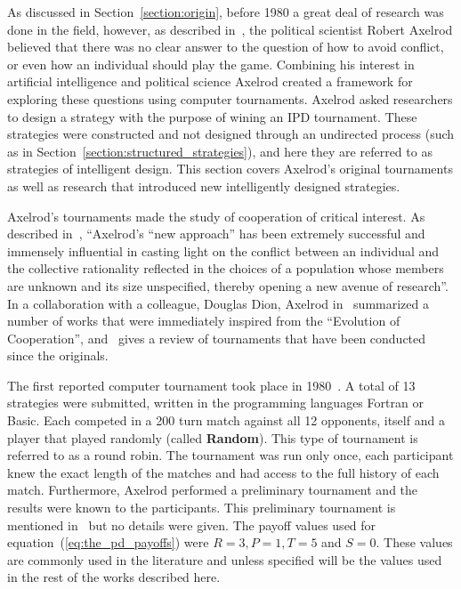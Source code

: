 \documentclass{article}
\theoremstyle{definition}
\begin{document}
As discussed in Section~\ref{section:origin}, before 1980 a great deal of
research was done in the field, however, as described in~\cite{Axelrod2012}, the
political scientist Robert Axelrod believed that there was no clear answer to the
question of how to avoid conflict, or even how an individual should play the
game. Combining his interest in artificial intelligence and political science
Axelrod created a framework for exploring these questions using computer
tournaments. Axelrod asked researchers to design a strategy with the purpose of
wining an IPD tournament. These strategies were constructed and not designed
through an undirected process (such as in
Section~\ref{section:structured_strategies}), and here they are referred to as
strategies of intelligent design. This section covers Axelrod's original
tournaments as well as research that introduced new intelligently designed
strategies.

Axelrod's tournaments made the study of cooperation of critical interest. As
described in~\cite{Rapoport2015}, ``Axelrod's “new approach” has been extremely
successful and immensely influential in casting light on the conflict between an
individual and the collective rationality reflected in the choices of a
population whose members are unknown and its size unspecified, thereby opening a
new avenue of research''. In a collaboration with a colleague, Douglas Dion,
Axelrod in~\cite{Axelrod1988} summarized a number of works that were immediately
inspired from the ``Evolution of Cooperation'', and~\cite{Jurisic2012} gives a
review of tournaments that have been conducted since the originals.

The first reported computer tournament took place in 1980~\cite{Axelrod1980a}. A
total of 13 strategies were submitted, written in the programming languages
Fortran or Basic. Each competed in a 200 turn match against all 12 opponents,
itself and a player that played randomly (called \textbf{Random}). This type of
tournament is referred to as a round robin. The tournament was run only once,
each participant knew the exact length of the matches and had access to the full
history of each match. Furthermore, Axelrod performed a preliminary tournament
and the results were known to the participants. This preliminary tournament is
mentioned in~\cite{Axelrod1980a} but no details were given. The payoff values
used for equation~(\ref{eq:the_pd_payoffs}) were \(R=3, P=1, T=5\) and \(S=0\).
These values are commonly used in the literature and unless specified will be
the values used in the rest of the works described here.
\end{document}

